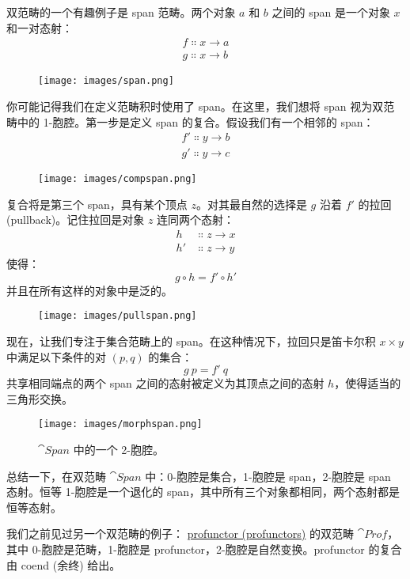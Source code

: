 双范畴的一个有趣例子是 span 范畴。两个对象 $a$ 和 $b$ 之间的 span 是一个对象 $x$ 和一对态射：
\begin{gather*}
  f \Colon x \to a \\
  g \Colon x \to b
\end{gather*}

\begin{figure}[H]
  \centering
  \texttt{[image: images/span.png]}
\end{figure}

\noindent
你可能记得我们在定义范畴积时使用了 span。在这里，我们想将 span 视为双范畴中的 1-胞腔。第一步是定义 span 的复合。假设我们有一个相邻的 span：
\begin{gather*}
  f' \Colon y \to b \\
  g' \Colon y \to c
\end{gather*}

\begin{figure}[H]
  \centering
  \texttt{[image: images/compspan.png]}
\end{figure}

\noindent
复合将是第三个 span，具有某个顶点 $z$。对其最自然的选择是 $g$ 沿着 $f'$ 的拉回 (pullback)。记住拉回是对象 $z$ 连同两个态射：
\begin{align*}
  h  & \Colon z \to x \\
  h' & \Colon z \to y
\end{align*}
使得：
\[g \circ h = f' \circ h'\]
并且在所有这样的对象中是泛的。

\begin{figure}[H]
  \centering
  \texttt{[image: images/pullspan.png]}
\end{figure}

\noindent
现在，让我们专注于集合范畴上的 span。在这种情况下，拉回只是笛卡尔积 $x \times y$ 中满足以下条件的对 $(p, q)$ 的集合：
\[g\ p = f'\ q\]
共享相同端点的两个 span 之间的态射被定义为其顶点之间的态射 $h$，使得适当的三角形交换。

\begin{figure}[H]
  \centering
  \texttt{[image: images/morphspan.png]}
  \caption{$\cat{Span}$ 中的一个 2-胞腔。}
\end{figure}

\noindent
总结一下，在双范畴 $\cat{Span}$ 中：0-胞腔是集合，1-胞腔是 span，2-胞腔是 span 态射。恒等 1-胞腔是一个退化的 span，其中所有三个对象都相同，两个态射都是恒等态射。

我们之前见过另一个双范畴的例子： \hyperref[ends-and-coends]{profunctor (profunctors)} 的双范畴 $\cat{Prof}$，其中 0-胞腔是范畴，1-胞腔是 profunctor，2-胞腔是自然变换。profunctor 的复合由 coend (余终) 给出。

